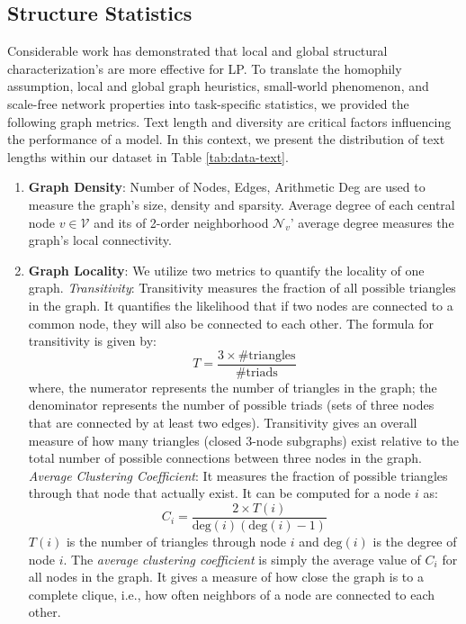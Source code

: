 \subsection{Structure Statistics}
\label{subsec:app-dataset_statistics}
Considerable work has demonstrated that local and global structural characterization's are more effective for LP. To translate the homophily assumption, local and global graph heuristics, small-world phenomenon, and scale-free network properties into task-specific statistics, we provided the following graph metrics. Text length and diversity are critical factors influencing the performance of a model. In this context, we present the distribution of text lengths within our dataset in Table \ref{tab:data-text}.

\begin{enumerate}[left=0pt, labelsep=0.5em, itemsep=0em]
    \item \textbf{Graph Density}: Number of Nodes, Edges, Arithmetic Deg are used to measure the graph's size, density and sparsity. Average degree of each central node $v \in \mathcal{V}$ and its of 2-order neighborhood $\mathcal{N}_{v}$' average degree measures the graph's local connectivity.
    \item \textbf{Graph Locality}: We utilize two metrics to quantify the locality of one graph. 
    \textit{Transitivity}: Transitivity measures the fraction of all possible triangles in the graph. It quantifies the likelihood that if two nodes are connected to a common node, they will also be connected to each other. The formula for transitivity is given by:
    \begin{equation}
    T = \frac{3 \times \# \text{triangles}}{\# \text{triads}}
    \end{equation}
    where, the numerator represents the number of triangles in the graph; the denominator represents the number of possible triads (sets of three nodes that are connected by at least two edges). Transitivity gives an overall measure of how many triangles (closed 3-node subgraphs) exist relative to the total number of possible connections between three nodes in the graph.
    \textit{Average Clustering Coefficient}: It measures the fraction of possible triangles through that node that actually exist. It can be computed for a node $i$ as:
    \begin{equation}
        C_i = \frac{2 \times T(i)}{\text{deg}(i)(\text{deg}(i) - 1)}
    \end{equation}
    $T(i)$ is the number of triangles through node $i$ and $\text{deg}(i)$ is the degree of node $i$. The \textit{average clustering coefficient} is simply the average value of $C_i$ for all nodes in the graph. It gives a measure of how close the graph is to a complete clique, i.e., how often neighbors of a node are connected to each other.

\end{enumerate}
